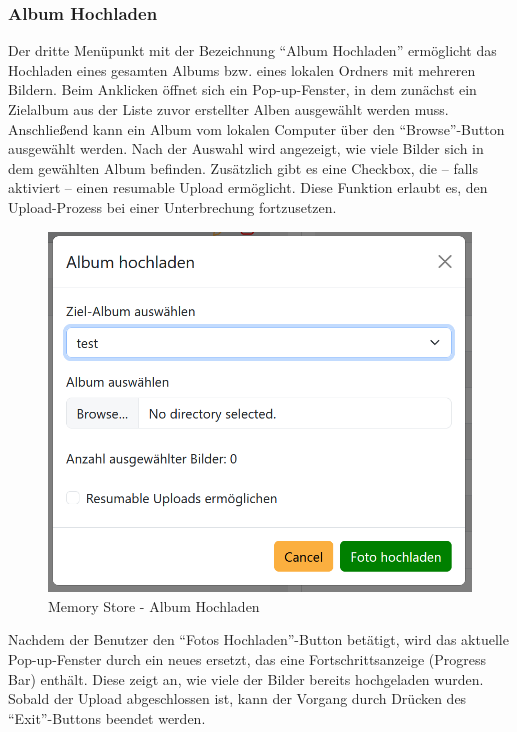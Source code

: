 \subsubsection{Album Hochladen}

Der dritte Menüpunkt mit der Bezeichnung ``Album Hochladen'' ermöglicht das 
Hochladen eines gesamten Albums bzw. eines lokalen Ordners mit mehreren Bildern. 
Beim Anklicken öffnet sich ein Pop-up-Fenster, in dem zunächst ein Zielalbum aus 
der Liste zuvor erstellter Alben ausgewählt werden muss. Anschlie\ss{}end kann ein 
Album vom lokalen Computer über den ``Browse''-Button ausgewählt werden. Nach der 
Auswahl wird angezeigt, wie viele Bilder sich in dem gewählten Album befinden. 
Zusätzlich gibt es eine Checkbox, die – falls aktiviert – einen resumable Upload 
ermöglicht. Diese Funktion erlaubt es, den Upload-Prozess bei einer Unterbrechung 
fortzusetzen.

\begin{figure}
    \centering
    \includegraphics[scale=0.4]{pics/memory_store_teil1_button3.PNG}
    \caption{Memory Store - Album Hochladen}
    \label{fig:memory-store-album-hochladen}
\end{figure}

Nachdem der Benutzer den ``Fotos Hochladen''-Button betätigt, wird das aktuelle 
Pop-up-Fenster durch ein neues ersetzt, das eine Fortschrittsanzeige (Progress Bar) 
enthält. Diese zeigt an, wie viele der Bilder bereits hochgeladen wurden. Sobald 
der Upload abgeschlossen ist, kann der Vorgang durch Drücken des ``Exit''-Buttons 
beendet werden.

